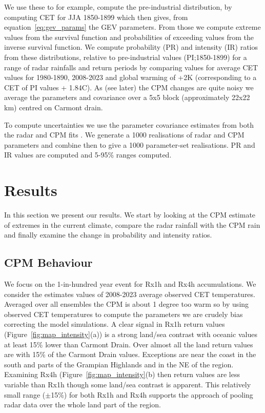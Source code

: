 \documentclass[11pt,a4paper]{article}
\begin{document}
We use these to for example, compute the pre-industrial distribution, by computing CET for JJA 1850-1899 which then gives, from equation~\ref{eq:gev_params} the GEV parameters. From those we compute  extreme values from the survival function and probabilities of exceeding values from the  inverse survival function. We compute probability (PR) and intensity (IR) ratios from these distributions, relative to pre-industrial values (PI;1850-1899) for a range of radar rainfalls and return periods by comparing values for average CET values for 1980-1890, 2008-2023 and global warming of +2K (corresponding to a CET of PI values + 1.84C\parencite{tett2023edinburgh}). As (see later) the CPM changes are quite noisy we average the parameters and covariance over a 5x5 block (approximately 22x22 km) centred on Carmont drain.

To compute uncertainties we use the parameter covariance  estimates from both the radar and CPM fits \parencite{gilleland2016extremes}. We generate a 1000 realisations of radar and CPM parameters and combine then to give a 1000 parameter-set realisations. PR and IR values are computed and 5-95\% ranges computed. 

\section{Results}

In this section we present our results. We start by looking at the CPM estimate of extremes in the current climate, compare the radar rainfall with the CPM rain and finally examine the change in probability and intensity ratios. 
\subsection{CPM Behaviour}
We focus on the 1-in-hundred year event for Rx1h and Rx4h accumulations.  We consider the estimates values of 2008-2023 average observed CET temperatures. Averaged over all ensembles the CPM is about 1 degree too warm so by using observed CET temperatures to compute the parameters we are crudely bias correcting the model simulations. A clear signal in Rx1h return values (Figure~\ref{fig:map_intensity}(a)) is a strong land/sea contrast with oceanic values at least 15\% lower than Carmont Drain.  Over almost all the land return values are with 15\% of the Carmont Drain values. Exceptions are near the coast in the south and parts of the Grampian Highlands and in the NE of the region.  Examining Rx4h (Figure~\ref{fig:map_intensity}(b) then return values are less variable than Rx1h though some land/sea contrast is apparent.  This relatively small range ($\pm$15\%) for both Rx1h and Rx4h supports the approach of pooling radar data over the whole land part of the region. 
\end{document}
